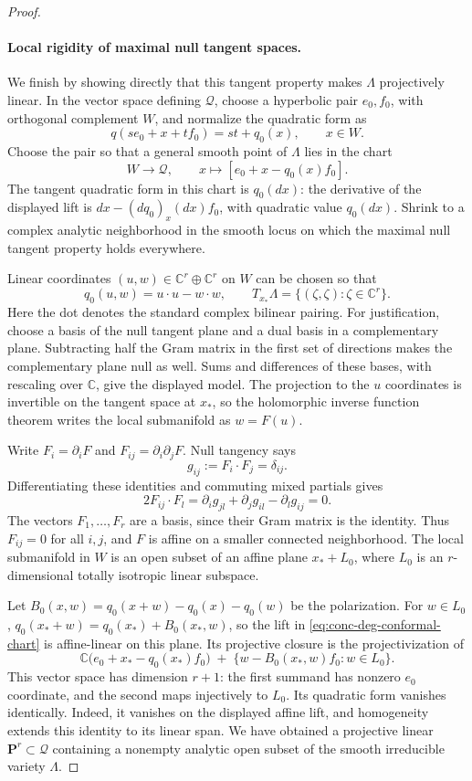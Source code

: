 \begin{proof}
\paragraph{Local rigidity of maximal null tangent spaces.}
We finish by showing directly that this tangent property makes $\Lambda$ projectively linear.  In the vector space defining $\mathcal{Q}$, choose a hyperbolic pair $e_0,f_0$, with orthogonal complement $W$, and normalize the quadratic form as
\[
 q(se_0+x+tf_0)=st+q_0(x),\qquad x\in W.
\]
Choose the pair so that a general smooth point of $\Lambda$ lies in the chart
\begin{equation}
 W\longrightarrow\mathcal{Q},
 \qquad x\longmapsto[e_0+x-q_0(x)f_0].
 \label{eq:conc-deg-conformal-chart}
\end{equation}
The tangent quadratic form in this chart is $q_0(dx)$: the derivative of the displayed lift is $dx-(dq_0)_x(dx)f_0$, with quadratic value $q_0(dx)$. Shrink to a complex analytic neighborhood in the smooth locus on which the maximal null tangent property holds everywhere.

Linear coordinates $(u,w)\in\mathbb{C}^r\oplus\mathbb{C}^r$ on $W$ can be chosen so that
\[
 q_0(u,w)=u\cdot u-w\cdot w,
 \qquad
 T_{x_*}\Lambda=\{(\zeta,\zeta):\zeta\in\mathbb{C}^r\}.
\]
Here the dot denotes the standard complex bilinear pairing. For justification, choose a basis of the null tangent plane and a dual basis in a complementary plane.  Subtracting half the Gram matrix in the first set of directions makes the complementary plane null as well.  Sums and differences of these bases, with rescaling over $\mathbb{C}$, give the displayed model. The projection to the $u$ coordinates is invertible on the tangent space at $x_*$, so the holomorphic inverse function theorem writes the local submanifold as $w=F(u)$.

Write $F_i=\partial_iF$ and $F_{ij}=\partial_i\partial_jF$. Null tangency says
\[
 g_{ij}:=F_i\cdot F_j=\delta_{ij}.
\]
Differentiating these identities and commuting mixed partials gives
\[
 2F_{ij}\cdot F_l
   =\partial_i g_{jl}+\partial_j g_{il}-\partial_l g_{ij}=0.
\]
The vectors $F_1,\ldots,F_r$ are a basis, since their Gram matrix is the identity.  Thus $F_{ij}=0$ for all $i,j$, and $F$ is affine on a smaller connected neighborhood. The local submanifold in $W$ is an open subset of an affine plane $x_*+L_0$, where $L_0$ is an $r$-dimensional totally isotropic linear subspace.

Let $B_0(x,w)=q_0(x+w)-q_0(x)-q_0(w)$ be the polarization. For $w\in L_0$, $q_0(x_*+w)=q_0(x_*)+B_0(x_*,w)$, so the lift in \eqref{eq:conc-deg-conformal-chart} is affine-linear on this plane. Its projective closure is the projectivization of
\[
 \mathbb{C}\bigl(e_0+x_*-q_0(x_*)f_0\bigr)
 \; +\;
 \{w-B_0(x_*,w)f_0:w\in L_0\}.
\]
This vector space has dimension $r+1$: the first summand has nonzero $e_0$ coordinate, and the second maps injectively to $L_0$.  Its quadratic form vanishes identically.  Indeed, it vanishes on the displayed affine lift, and homogeneity extends this identity to its linear span.  We have obtained a projective linear $\mathbf{P}^r\subset\mathcal{Q}$ containing a nonempty analytic open subset of the smooth irreducible variety $\Lambda$.


\end{proof}
